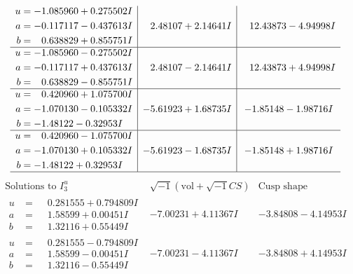\documentclass[1p]{elsarticle_modified}
\theoremstyle{definition}
\newcommand{\I}{\sqrt{-1}}
\begin{document}
$$\begin{array}{c|c|c}
\begin{aligned}
u &= -1.085960 + 0.275502 I \\
a &= -0.117117 - 0.437613 I \\
b &= \phantom{-}0.638829 + 0.855751 I\end{aligned}
 & \phantom{-}2.48107 + 2.14641 I & \phantom{-}12.43873 - 4.94998 I \\ \hline\begin{aligned}
u &= -1.085960 - 0.275502 I \\
a &= -0.117117 + 0.437613 I \\
b &= \phantom{-}0.638829 - 0.855751 I\end{aligned}
 & \phantom{-}2.48107 - 2.14641 I & \phantom{-}12.43873 + 4.94998 I \\ \hline\begin{aligned}
u &= \phantom{-}0.420960 + 1.075700 I \\
a &= -1.070130 - 0.105332 I \\
b &= -1.48122 - 0.32953 I\end{aligned}
 & -5.61923 + 1.68735 I & -1.85148 - 1.98716 I \\ \hline\begin{aligned}
u &= \phantom{-}0.420960 - 1.075700 I \\
a &= -1.070130 + 0.105332 I \\
b &= -1.48122 + 0.32953 I\end{aligned}
 & -5.61923 - 1.68735 I & -1.85148 + 1.98716 I\\
 \hline 
 \end{array}$$\newpage$$\begin{array}{c|c|c}  
\text{Solutions to }I^u_{3}& \I (\text{vol} + \sqrt{-1}CS) & \text{Cusp shape}\\
 \hline 
\begin{aligned}
u &= \phantom{-}0.281555 + 0.794809 I \\
a &= \phantom{-}1.58599 + 0.00451 I \\
b &= \phantom{-}1.32116 + 0.55449 I\end{aligned}
 & -7.00231 + 4.11367 I & -3.84808 - 4.14953 I \\ \hline\begin{aligned}
u &= \phantom{-}0.281555 - 0.794809 I \\
a &= \phantom{-}1.58599 - 0.00451 I \\
b &= \phantom{-}1.32116 - 0.55449 I\end{aligned}
 & -7.00231 - 4.11367 I & -3.84808 + 4.14953 I \\ \hline\begin{aligned}

\end{aligned}
\end{array}$$
\end{document}
